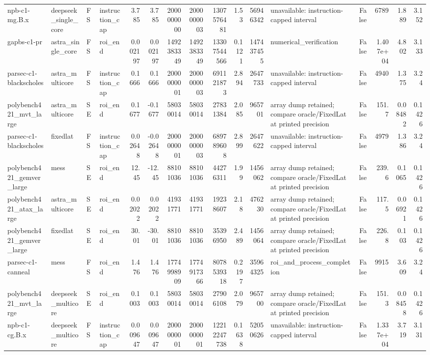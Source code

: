\begin{tabular}{llllrrrrrrrlrrrr}
npb-c1-mg.B.x & deepseek\_single\_core & FS & instruction\_cap & 3.785 & 3.785 & 2000000000 & 2000000003 & 1307576481 & 1.53 & 56946342 & unavailable: instruction-capped interval & False & 6789 & 1.889 & 3.152 \\
gapbs-c1-pr & astra\_single\_core & FS & roi\_end & 0.002197 & 0.002197 & 1492383349 & 1492383349 & 13307544566 & 0.1121 & 147437455 & numerical\_verification & False & 1.407e+04 & 4.802 & 3.133 \\
parsec-c1-blackscholes & astra\_multicore & FS & instruction\_cap & 0.1666 & 0.1666 & 2000000001 & 2000000003 & 691121873 & 2.894 & 2647733 & unavailable: instruction-capped interval & False & 4940 & 1.375 & 3.24 \\
polybench421\_mvt\_large & astra\_multicore & SE & roi\_end & 0.1677 & -0.1677 & 58030014 & 58030014 & 27831384 & 2.085 & 965701 & array dump retained; compare oracle/FixedLat at printed precision & False & 151.7 & 0.08482 & 0.1426 \\
parsec-c1-blackscholes & fixedlat & FS & instruction\_cap & 0.02648 & -0.02648 & 2000000001 & 2000000003 & 689789608 & 2.899 & 2647622 & unavailable: instruction-capped interval & False & 4979 & 1.386 & 3.24 \\
polybench421\_gemver\_large & mess & SE & roi\_end & 12.45 & -12.45 & 88101036 & 88101036 & 44276311 & 1.99 & 1456062 & array dump retained; compare oracle/FixedLat at printed precision & False & 239.6 & 0.1065 & 0.1426 \\
polybench421\_atax\_large & astra\_multicore & SE & roi\_end & 0.02022 & 0.02022 & 41931771 & 41931771 & 19238607 & 2.18 & 476230 & array dump retained; compare oracle/FixedLat at printed precision & False & 117.5 & 0.06921 & 0.1426 \\
polybench421\_gemver\_large & fixedlat & SE & roi\_end & 30.01 & -30.01 & 88101036 & 88101036 & 35396950 & 2.489 & 1456064 & array dump retained; compare oracle/FixedLat at printed precision & False & 226.8 & 0.103 & 0.1426 \\
parsec-c1-canneal & mess & FS & roi\_end & 1.476 & 1.476 & 1774998909 & 1774917366 & 8078539318 & 0.2197 & 35964325 & roi\_and\_process\_completion & False & 9915 & 3.609 & 3.24 \\
polybench421\_mvt\_large & deepseek\_multicore & SE & roi\_end & 0.1003 & 0.1003 & 58030014 & 58030014 & 27906108 & 2.079 & 965700 & array dump retained; compare oracle/FixedLat at printed precision & False & 151.3 & 0.08458 & 0.1426 \\
npb-c1-cg.B.x & deepseek\_multicore & FS & instruction\_cap & 0.009647 & 0.009647 & 2000000001 & 2000000001 & 12212247738 & 0.1638 & 52050626 & unavailable: instruction-capped interval & False & 1.337e+04 & 3.719 & 3.131 \\

\end{tabular}
